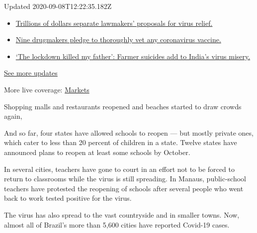 Updated 2020-09-08T12:22:35.182Z

\begin{itemize}
\tightlist
\item
  \href{https://www.nytimes3xbfgragh.onion/2020/09/08/world/covid-19-coronavirus.html?action=click\&pgtype=Article\&state=default\&region=MAIN_CONTENT_1\&context=storylines_live_updates\#link-46162376}{Trillions
  of dollars separate lawmakers' proposals for virus relief.}
\item
  \href{https://www.nytimes3xbfgragh.onion/2020/09/08/world/covid-19-coronavirus.html?action=click\&pgtype=Article\&state=default\&region=MAIN_CONTENT_1\&context=storylines_live_updates\#link-679303d7}{Nine
  drugmakers pledge to thoroughly vet any coronavirus vaccine.}
\item
  \href{https://www.nytimes3xbfgragh.onion/2020/09/08/world/covid-19-coronavirus.html?action=click\&pgtype=Article\&state=default\&region=MAIN_CONTENT_1\&context=storylines_live_updates\#link-1c973131}{`The
  lockdown killed my father': Farmer suicides add to India's virus
  misery.}
\end{itemize}

\href{https://www.nytimes3xbfgragh.onion/2020/09/08/world/covid-19-coronavirus.html?action=click\&pgtype=Article\&state=default\&region=MAIN_CONTENT_1\&context=storylines_live_updates}{See
more updates}

More live coverage:
\href{https://www.nytimes3xbfgragh.onion/live/2020/09/08/business/stock-market-today-coronavirus?action=click\&pgtype=Article\&state=default\&region=MAIN_CONTENT_1\&context=storylines_live_updates}{Markets}

Shopping malls and restaurants reopened and beaches started to draw
crowds again,

And so far, four states have allowed schools to reopen --- but mostly
private ones, which cater to less than 20 percent of children in a
state. Twelve states have announced plans to reopen at least some
schools by October.

In several cities, teachers have gone to court in an effort not to be
forced to return to classrooms while the virus is still spreading. In
Manaus, public-school teachers have protested the reopening of schools
after several people who went back to work tested positive for the
virus.

The virus has also spread to the vast countryside and in smaller towns.
Now, almost all of Brazil's more than 5,600 cities have reported
Covid-19 cases.

